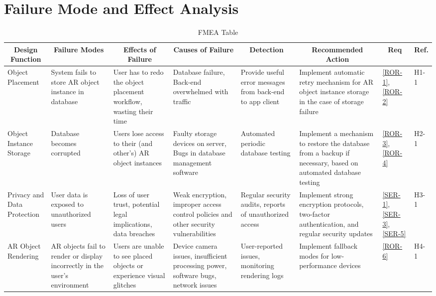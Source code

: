 \documentclass{article}
\begin{document}
\section{Failure Mode and Effect Analysis}
\label{sub:fmea}

\begin{landscape}
\begin{table}[hp]
    \caption{FMEA Table} \label{FMEA}
    \centering
    \begin{footnotesize}
    \begin{tabular}{|p{1in}|p{1in}|p{1.5in}|p{1.5in}|p{1.5in}|p{2in}|p{0.4in}|p{0.4in}|}
        \hline
        \multicolumn{1}{|c|}{\textbf{Design Function}} & \multicolumn{1}{c|}{\textbf{Failure Modes}} & \multicolumn{1}{c|}{\textbf{Effects of Failure}} & \multicolumn{1}{c|}{\textbf{Causes of Failure}} & \multicolumn{1}{|c|}{\textbf{Detection}} & \multicolumn{1}{c|}{\textbf{Recommended Action}} & \multicolumn{1}{c|}{\textbf{Req}} & \multicolumn{1}{c|}{\textbf{Ref.}} \\
        \hline
        Object Placement & System fails to store AR object instance in database & User has to redo the object placement workflow, wasting their time & Database failure, Back-end overwhelmed with traffic & Provide useful error messages from back-end to app client & Implement automatic retry mechanism for AR object instance storage in the case of storage failure & \ref{ROR-1}, \ref{ROR-2} & H1-1\\
        \hline
        Object Instance Storage & Database becomes corrupted & Users lose access to their (and other's) AR object instances & Faulty storage devices on server, Bugs in database management software & Automated periodic database testing & Implement a mechanism to restore the database from a backup if necessary, based on automated database testing & \ref{ROR-3}, \ref{ROR-4} & H2-1 \\
        \hline
        Privacy and Data Protection & User data is exposed to unauthorized users & Loss of user trust, potential legal implications, data breaches & Weak encryption, improper access control policies and other security vulnerabilities & Regular security audits, reports of unauthorized access & Implement strong encryption protocols, two-factor authentication, and regular security updates & \ref{SER-1}, \ref{SER-3}, \ref{SER-5} & H3-1 \\
        \hline
        AR Object Rendering &  AR objects fail to render or display incorrectly in the user's environment & Users are unable to see placed objects or experience visual glitches & Device camera issues, insufficient processing power, software bugs, network issues & User-reported issues, monitoring rendering logs & Implement fallback modes for low-performance devices & \ref{ROR-6} & H4-1 \\

\end{tabular}
\end{footnotesize}
\end{table}
\end{landscape}
\end{document}
